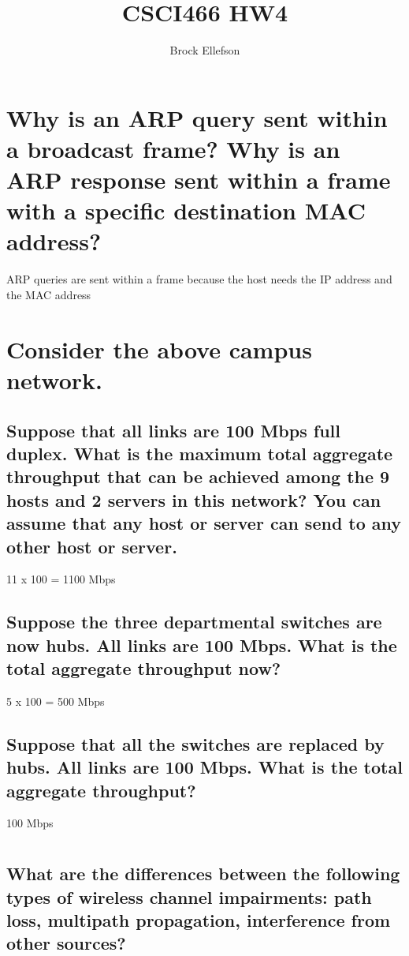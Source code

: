 \documentclass[10pt,a4paper]{article}
\author{Brock Ellefson}
\title{CSCI466 HW4}
\begin{document}
\maketitle
\section{Why is an ARP query sent within a broadcast frame? Why is an ARP response sent within a frame with a specific destination MAC address?}

ARP queries are sent within a frame because the host needs the IP address and the MAC address


\section{Consider the above campus network.}

\subsection{Suppose that all links are 100 Mbps full duplex. What is the maximum total aggregate throughput that can be achieved among the 9 hosts and 2 servers in this network? You can assume that any host or server can send to any other host or server.}

11 x 100 = 1100 Mbps

\subsection{ Suppose the three departmental switches are now hubs. All links are 100 Mbps. What is the total aggregate throughput now?}

5 x 100 = 500 Mbps

\subsection{Suppose that all the switches are replaced by hubs. All links are 100 Mbps. What is the total aggregate throughput?}

100 Mbps

\section{}

\subsection{What are the differences between the following types of wireless channel impairments: path loss, multipath propagation, interference from other sources?}
\end{document}
